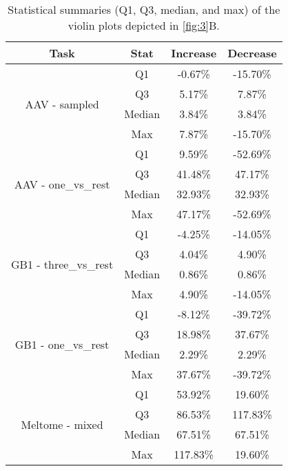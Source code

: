 \begin{table}
	\caption{\centering Statistical summaries (Q1, Q3, median, and max) of the violin plots depicted in \autoref{fig:3}B.}
	\label{tab:violin}
	\centering
	\renewcommand{\arraystretch}{1.5}
	\begin{tabular}{cccc}
	\toprule
	Task & Stat & Increase & Decrease \\
	\midrule
	\multirow{4}{*}{AAV - sampled} & Q1 & -0.67\% & -15.70\% \\
	 & Q3 & 5.17\% & 7.87\% \\
	 & Median & 3.84\% & 3.84\% \\
	 & Max & 7.87\% & -15.70\% \\
	\hline
	\multirow{4}{*}{AAV - one\_vs\_rest} & Q1 & 9.59\% & -52.69\% \\
	 & Q3 & 41.48\% & 47.17\% \\
	 & Median & 32.93\% & 32.93\% \\
	 & Max & 47.17\% & -52.69\% \\
	\hline
	\multirow{4}{*}{GB1 - three\_vs\_rest} & Q1 & -4.25\% & -14.05\% \\
	 & Q3 & 4.04\% & 4.90\% \\
	 & Median & 0.86\% & 0.86\% \\
	 & Max & 4.90\% & -14.05\% \\
	\hline
	\multirow{4}{*}{GB1 - one\_vs\_rest} & Q1 & -8.12\% & -39.72\% \\
	 & Q3 & 18.98\% & 37.67\% \\
	 & Median & 2.29\% & 2.29\% \\
	 & Max & 37.67\% & -39.72\% \\
	\hline
	\multirow{4}{*}{Meltome - mixed} & Q1 & 53.92\% & 19.60\% \\
	 & Q3 & 86.53\% & 117.83\% \\
	 & Median & 67.51\% & 67.51\% \\
	 & Max & 117.83\% & 19.60\% \\
	\hline
	\end{tabular}
\end{table}
